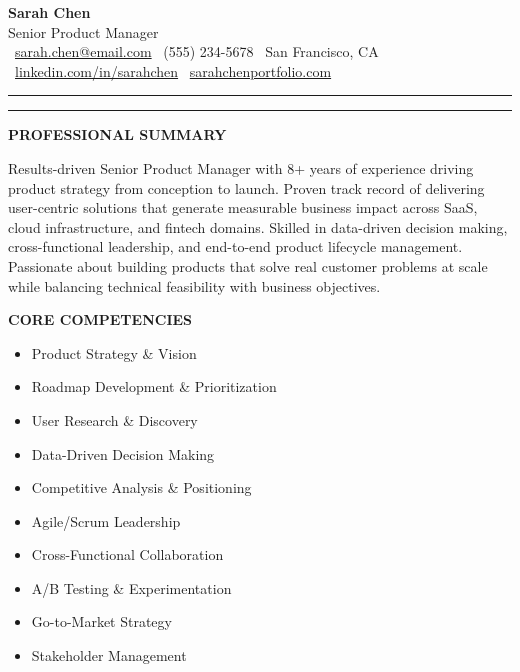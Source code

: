 \documentclass[11pt,letterpaper]{article}
\newcommand{\cvsection}[1]{%
  \begin{sectionbox}
    {\Large\bfseries\color{primary}\MakeUppercase{#1}}
  \end{sectionbox}
}
\begin{document}
\begin{center}
  {\fontsize{28}{34}\selectfont\bfseries\color{primary}Sarah Chen}\\[4pt]
  {\Large\color{accent}Senior Product Manager}\\[10pt]
  {\small\color{darkgray}
    \faEnvelope\ \href{mailto:sarah.chen@email.com}{sarah.chen@email.com}
    \hspace{10pt}
    \faPhone\ (555) 234-5678
    \hspace{10pt}
    \faMapMarker\ San Francisco, CA\\[3pt]
    \faLinkedinIn\ \href{https://linkedin.com/in/sarahchen}{linkedin.com/in/sarahchen}
    \hspace{10pt}
    \faGlobe\ \href{https://sarahchenportfolio.com}{sarahchenportfolio.com}
  }
\end{center}

\vspace{2pt}
{\color{accent}\rule{\linewidth}{0.6pt}}
\vspace{2pt}
{\color{lightgray}\rule{\linewidth}{0.4pt}}

\cvsection{Professional Summary}

\noindent Results-driven Senior Product Manager with 8+ years of experience driving product strategy from conception to launch. Proven track record of delivering user-centric solutions that generate measurable business impact across SaaS, cloud infrastructure, and fintech domains. Skilled in data-driven decision making, cross-functional leadership, and end-to-end product lifecycle management. Passionate about building products that solve real customer problems at scale while balancing technical feasibility with business objectives.

\cvsection{Core Competencies}

\noindent
\begin{minipage}[t]{0.48\linewidth}
  \begin{itemize}
    \item Product Strategy \& Vision
    \item Roadmap Development \& Prioritization
    \item User Research \& Discovery
    \item Data-Driven Decision Making
    \item Competitive Analysis \& Positioning
  \end{itemize}
\end{minipage}%
\hfill%
\begin{minipage}[t]{0.48\linewidth}
  \begin{itemize}
    \item Agile/Scrum Leadership
    \item Cross-Functional Collaboration
    \item A/B Testing \& Experimentation
    \item Go-to-Market Strategy
    \item Stakeholder Management
  \end{itemize}
\end{minipage}
\par
\end{document}
